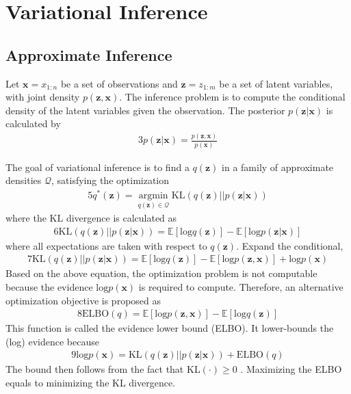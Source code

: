 \documentclass[letterpaper]{article}
\newcommand{\bz}{\mathbf{z}}
\newcommand{\bx}{\mathbf{x}}
\begin{document}
\section{Variational Inference}
\subsection{Approximate Inference}

Let $\bx=x_{1:n}$ be a set of observations and $\bz=z_{1:m}$ be a set of latent variables, with joint density $p(\bz,\bx)$. The inference problem is to compute the conditional density of the latent variables given the observation. The posterior $p(\bz|\bx)$ is calculated by
\begin{alignat}{3}\label{eq:3}
p(\bz|\bx) = \frac{p(\bz, \bx)}{p(\bx)}
\end{alignat}

The goal of variational inference is to find a $q(\bz)$ in a family of approximate densities $\mathscr{Q}$, satisfying the optimization
\begin{alignat}{5}\label{eq:5}
q^{\ast} (\bz) = \underset{q(\bz)\in \mathscr{Q}}{\operatorname{argmin}} \mathrm{KL} (q(\bz) || p(\bz|\bx))
\end{alignat}
where the $\mathrm{KL}$ divergence is calculated as
\begin{alignat}{6}\label{eq:6}
\mathrm{KL} (q(\bz) || p(\bz|\bx)) = \mathbb{E}[\mathrm{log}q(\bz)] - \mathbb{E}[\mathrm{log}p(\bz|\bx)]
\end{alignat}
where all expectations are taken with respect to $q(\bz)$. Expand the conditional,
\begin{alignat}{7}\label{eq:7}
\mathrm{KL} (q(\bz) || p(\bz|\bx)) = \mathbb{E}[\mathrm{log}q(\bz)] - \mathbb{E}[\mathrm{log}p(\bz, \bx)] + \mathrm{log}p(\bx)
\end{alignat}
Based on the above equation, the optimization problem is not computable because the evidence $\mathrm{log}p(\bx)$ is required to compute. Therefore, an alternative optimization objective is proposed as
\begin{alignat}{8}\label{eq:8}
\mathrm{ELBO}(q) = \mathbb{E}[\mathrm{log}p(\bz, \bx)] - \mathbb{E}[\mathrm{log}q(\bz)]
\end{alignat}
This function is called the evidence lower bound (ELBO). It lower-bounds the (log) evidence because
\begin{alignat}{9}\label{eq:9}
\mathrm{log}p(\bx) = \mathrm{KL} (q(\bz) || p(\bz|\bx)) + \mathrm{ELBO}(q)
\end{alignat}
The bound then follows from the fact that $\mathrm{KL} (\cdot) \geq 0$ \citep{kullback1951information}. Maximizing the ELBO equals to minimizing the KL divergence.
\end{document}
